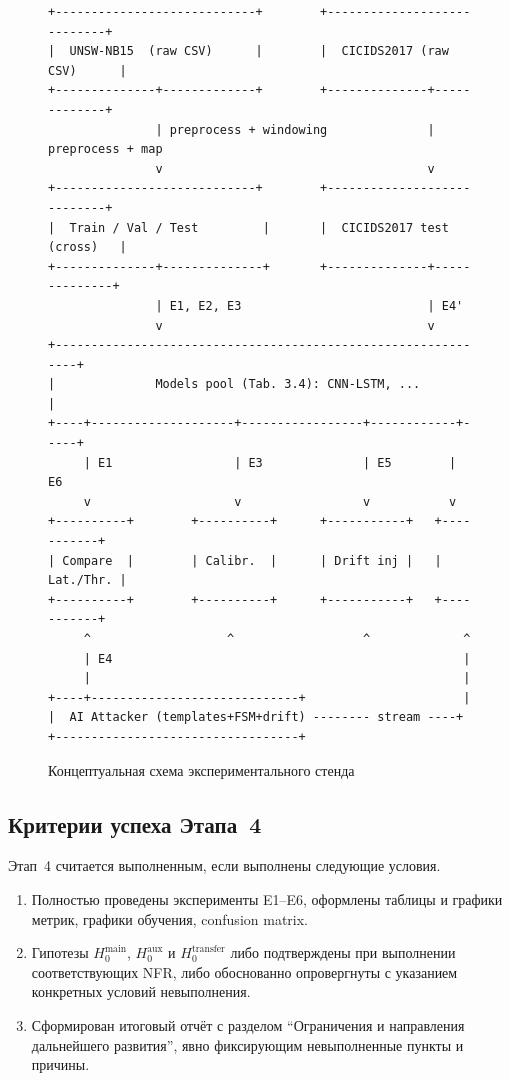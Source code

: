 \begin{figure}[H]
\centering
\begin{minipage}{0.94\linewidth}
\small
\begin{verbatim}
+----------------------------+        +----------------------------+
|  UNSW-NB15  (raw CSV)      |        |  CICIDS2017 (raw CSV)      |
+--------------+-------------+        +--------------+-------------+
               | preprocess + windowing              | preprocess + map
               v                                     v
+----------------------------+        +----------------------------+
|  Train / Val / Test         |       |  CICIDS2017 test (cross)   |
+--------------+--------------+       +--------------+--------------+
               | E1, E2, E3                          | E4'
               v                                     v
+--------------------------------------------------------------+
|              Models pool (Tab. 3.4): CNN-LSTM, ...           |
+----+--------------------+-----------------+------------+-----+
     | E1                 | E3              | E5        | E6
     v                    v                 v           v
+----------+        +----------+      +-----------+   +-----------+
| Compare  |        | Calibr.  |      | Drift inj |   | Lat./Thr. |
+----------+        +----------+      +-----------+   +-----------+
     ^                   ^                  ^             ^
     | E4                                                 |
     |                                                    |
+----+-----------------------------+                      |
|  AI Attacker (templates+FSM+drift) -------- stream ----+
+----------------------------------+
\end{verbatim}
\end{minipage}
\caption{Концептуальная схема экспериментального стенда}
\label{fig:experiment-stand}
\end{figure}

\subsection{Критерии успеха Этапа~4}

Этап~4 считается выполненным, если выполнены следующие условия.

\begin{enumerate}
    \item Полностью проведены эксперименты E1--E6, оформлены таблицы и
    графики метрик, графики обучения, confusion matrix.
    \item Гипотезы $H_0^{\text{main}}$, $H_0^{\text{aux}}$ и
    $H_0^{\text{transfer}}$ либо подтверждены при выполнении соответствующих
    NFR, либо обоснованно опровергнуты с указанием конкретных условий
    невыполнения.
    \item Сформирован итоговый отчёт с разделом ``Ограничения и направления
    дальнейшего развития'', явно фиксирующим невыполненные пункты и причины.
\end{enumerate}

